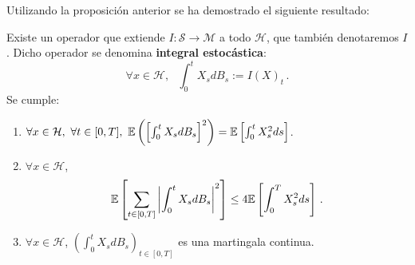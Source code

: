 Utilizando la proposición anterior se ha demostrado el siguiente resultado:
\begin{proposition}
    Existe un operador que extiende $I:\mathcal{S} \to \mathcal{M}$ a todo $\mathcal{H}$, que también denotaremos $I$. Dicho operador se denomina \textbf{integral estocástica}:
    \begin{equation*}
            \forall x \in \mathcal{H}, ~ ~ ~ \int_{0}^{t} X_s dB_s  := I(X)_t \,.
    \end{equation*}
Se cumple: 
\begin{enumerate}
    \item \label{IE:i} $\forall x \in \mathcal{H},~ \forall t \in [0,T], ~ \mathbb{E} \left( \left[ \int_{0}^{t} X_s dB_s \right]^2  \right) = \mathbb{E} \left[ \int_{0}^{t} X_s^2 ds  \right]$.
    \item $\label{IE:ii}\forall x \in \mathcal{H}$, 
        \begin{equation*}
            \mathbb{E} \left[ \sum_{t \in [0,T]} \abs{\int_{0}^{t} X_s dB_s}^2  \right] \le 4 \mathbb{E} \left[ \int_{0}^{T} X_s^2 ds \right]\,.
        \end{equation*}
    \item  \label{IE:iii} $\forall  x \in \mathcal{H}$, $\left(\int_{0}^{t} X_s dB_s \right)_{t \in [0,T]}$ es una martingala continua. 
\end{enumerate}
\end{proposition}
